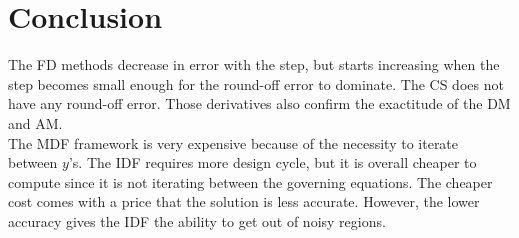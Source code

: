 \documentclass[letterpaper,12pt]{article}
\begin{document}
\section{Conclusion}

The FD methods decrease in error with the step, but starts increasing when the step becomes small enough for the round-off error to dominate. The CS does not have any round-off error. Those derivatives also confirm the exactitude of the DM and AM.\\

The MDF framework is very expensive because of the necessity to iterate between $y$'s. The IDF requires more design cycle, but it is overall cheaper to compute since it is not iterating between the governing equations. The cheaper cost comes with a price that the solution is less accurate. However, the lower accuracy gives the IDF the ability to get out of noisy regions.\\
\end{document}
